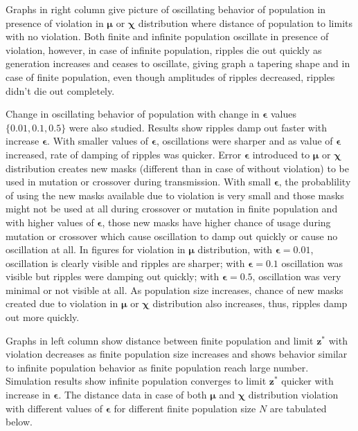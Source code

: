 Graphs in right column give picture of oscillating behavior of population in presence of violation in $\bm{\mu}$ or $\bm{\chi}$ distribution 
where distance of population to limits with no violation. Both finite and infinite population oscillate in presence of violation, however, in case of infinite population, ripples die out quickly as generation increases and ceases to oscillate, giving graph a tapering shape and in case of finite population, even though amplitudes of ripples decreased, ripples didn't die out completely. 

Change in oscillating behavior of population with change in $\bm{\epsilon}$ values $\{0.01, 0.1, 0.5\}$ were also studied. 
Results show ripples damp out faster with increase $\bm{\epsilon}$.
With smaller values of $\bm{\epsilon}$, oscillations were sharper and as value of $\bm{\epsilon}$ increased, rate of damping of ripples was quicker. 
Error $\bm{\epsilon}$ introduced to $\bm{\mu}$ or $\bm{\chi}$ distribution creates new masks (different than in case of without violation) to be used in mutation 
or crossover during transmission. With small $\bm{\epsilon}$, the probablility of using the new masks available due to violation is very small and 
those masks might not be used at all during crossover or mutation in finite population and with higher values of $\bm{\epsilon}$, 
those new masks have higher chance of usage during mutation or crossover which cause oscillation to damp out quickly or cause no oscillation at all. In figures for violation in 
$\bm{\mu}$ distribution, with $\bm{\epsilon} = 0.01$, oscillation is clearly visible and ripples are sharper; with $\bm{\epsilon} = 0.1$ oscillation was visible 
but ripples were damping out quickly;  with $\bm{\epsilon} = 0.5$, oscillation was very minimal or not visible at all. As population size increases, 
chance of new masks created due to violation in $\bm{\mu}$ or $\bm{\chi}$ distribution also increases, thus, ripples damp out more quickly.

Graphs in left column show distance between finite population and limit $\bm{z}^\ast$ with violation decreases as finite population size increases 
and shows behavior similar to infinite population behavior as finite population reach large number. Simulation results show infinite population converges 
to limit $\bm{z^\ast}$ quicker with increase in $\bm{\epsilon}$. The distance data in case of both 
$\bm{\mu}$ and $\bm{\chi}$ distribution violation with different values of $\bm{\epsilon}$ for different finite population size $N$ are tabulated below.
\newpage

\newpage


